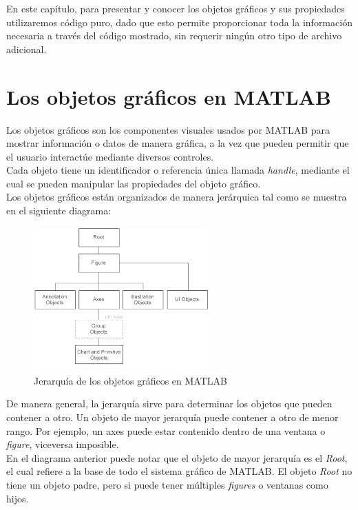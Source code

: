 En este capítulo, para presentar y conocer los objetos gráficos y sus
propiedades utilizaremos código puro, dado que esto permite proporcionar
toda la información necesaria a través del código mostrado, sin requerir
ningún otro tipo de archivo adicional.

\section{Los objetos gráficos en MATLAB}

Los objetos gráficos son los componentes visuales usados por MATLAB para
mostrar información o datos de manera gráfica, a la vez que pueden
permitir que el usuario interactúe mediante diversos controles. \\

Cada objeto tiene un identificador o referencia única llamada
\emph{handle}, mediante el cual se pueden manipular las propiedades del
objeto gráfico. \\

Los objetos gráficos están organizados de manera jerárquica tal como se
muestra en el siguiente diagrama:

\begin{figure}[htbp]
\centering
\includegraphics[width=0.6\textwidth]{images/ch8/objetos_graficos.png}
\caption{Jerarquía de los objetos gráficos en MATLAB}
\end{figure}

De manera general, la jerarquía sirve para determinar los objetos que
pueden contener a otro. Un objeto de mayor jerarquía puede contener a
otro de menor rango. Por ejemplo, un axes puede estar contenido dentro
de una ventana o \emph{figure}, viceversa imposible. \\

En el diagrama anterior puede notar que el objeto de mayor jerarquía es
el \emph{Root}, el cual refiere a la base de todo el sistema gráfico de
MATLAB. El objeto \emph{Root} no tiene un objeto padre, pero si puede
tener múltiples \emph{figures} o ventanas como hijos. \\


